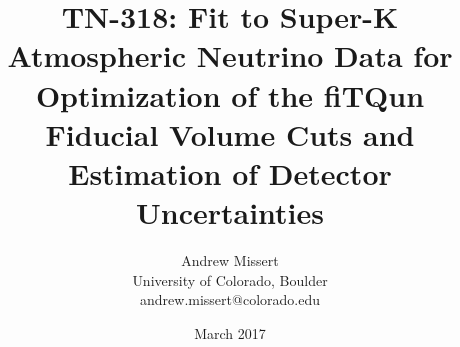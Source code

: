 \documentclass[12pt]{article}
\begin{document}
\title{TN-318: Fit to Super-K Atmospheric Neutrino Data for Optimization of the fiTQun Fiducial
Volume Cuts and Estimation of Detector Uncertainties}
\author{Andrew Missert\\University of Colorado, Boulder\\andrew.missert@colorado.edu}
\date{March 2017}
\maketitle




\FloatBarrier


\FloatBarrier



\FloatBarrier



\FloatBarrier

%

\FloatBarrier


\FloatBarrier

\appendix






{}




\end{document}
